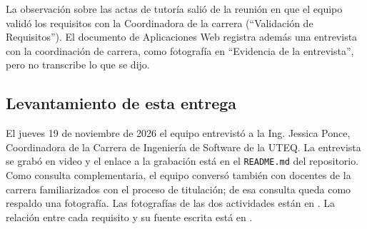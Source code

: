 La observación sobre las actas de tutoría salió de la reunión en que el equipo validó los requisitos con la Coordinadora de la carrera (\enquote{Validación de Requisitos}). El documento de Aplicaciones Web registra además una entrevista con la coordinación de carrera, como fotografía en \enquote{Evidencia de la entrevista}, pero no transcribe lo que se dijo.

\subsection{Levantamiento de esta entrega}

El jueves 19 de noviembre de 2026 el equipo entrevistó a la Ing. Jessica Ponce, Coordinadora de la Carrera de Ingeniería de Software de la UTEQ. La entrevista se grabó en video y el enlace a la grabación está en el \texttt{README.md} del repositorio. Como consulta complementaria, el equipo conversó también con docentes de la carrera familiarizados con el proceso de titulación; de esa consulta queda como respaldo una fotografía. Las fotografías de las dos actividades están en . La relación entre cada requisito y su fuente escrita está en .

